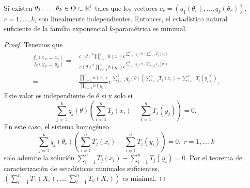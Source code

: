 \begin{theorem}
Si existen $\displaystyle \theta_{1}, \ldots, \theta_{k} \in \Theta \subset \mathbb{R}^{l} $ tales que los vectores $\displaystyle c_{r}=\left(q_{1}\left(\theta_{r}\right), \ldots, q_{k}\left(\theta_{r}\right)\right) $, $\displaystyle r = 1, \ldots, k $, son linealmente independientes. Entonces, el estadístico natural suficiente de la familia exponencial $\displaystyle k $-paramétrica es minimal.
\end{theorem}
\begin{proof}
Tenemos que 
\[
\begin{split}
	\frac{f_{\theta}\left(x_{1}, \ldots, x_{n}\right)}{f_{\theta}\left(y_{1}, \ldots, y_{n}\right)} = & \frac{c\left(\theta\right)^{n}\prod^{n}_{i=1}h\left(x_{i}\right)e^{\sum^{k}_{j=1}q_{j}\left(\theta\right)\sum^{n}_{i=1}T_{j}\left(x_{i}\right)}}{c\left(\theta\right)^{n}\prod^{n}_{i=1}h\left(y_{i}\right)e^{\sum^{k}_{j=1}q_{j}\left(\theta\right)\sum^{n}_{i=1}T_{j}\left(y_{i}\right)}} \\
	= & \frac{\prod^{n}_{i=1}h\left(x_{i}\right)}{\prod^{n}_{i=1}h\left(y_{i}\right)}e^{\sum^{k}_{j = 1}q_{j}\left(\theta\right)\left(\sum^{n}_{i=1}T_{j}\left(x_{i}\right)-\sum^{n}_{i=1}T_{j}\left(y_{j}\right)\right)}.
\end{split}
\]
Este valor es independiente de $\displaystyle \theta $ si y solo si 
\[ \sum^{k}_{j = 1}q_{j}\left(\theta\right)\left(\sum^{n}_{i=1}T_{j}\left(x_{i}\right)-\sum^{n}_{i=1}T_{j}\left(y_{j}\right)\right)=0.\]
En este caso, el sistema homogéneo 
\[\sum^{k}_{j = 1}q_{j}\left(\theta_{r}\right)\left(\sum^{n}_{i=1}T_{j}\left(x_{i}\right)-\sum^{n}_{i = 1}T_{j}\left(y_{i}\right)\right)=0, \; r = 1, \ldots, k \]
solo ademite la solución $\displaystyle \sum^{n}_{i=1}T_{j}\left(x_{i}\right)-\sum^{n}_{i=1}T_{j}\left(y_{i}\right)=0 $. Por el teorema de caracterización de estadísticos minimales suficientes, $\displaystyle \left(\sum^{n}_{i= 1}T_{1}\left(X_{i}\right), \ldots, \sum^{n}_{i=1}T_{k}\left(X_{i}\right)\right) $ es minimal. 
\end{proof}
